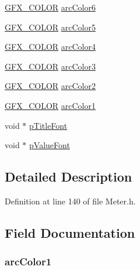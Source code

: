 \begin{DoxyCompactItemize}
\item 
\hyperlink{gfxcolors_8h_a0658edb6e7bd88d6e9a185711893441c}{G\+F\+X\+\_\+\+C\+O\+L\+O\+R} \hyperlink{struct_m_e_t_e_r_aaacd0d38be129470d8bf48715356357e}{arc\+Color6}
\item 
\hyperlink{gfxcolors_8h_a0658edb6e7bd88d6e9a185711893441c}{G\+F\+X\+\_\+\+C\+O\+L\+O\+R} \hyperlink{struct_m_e_t_e_r_adb53152dff0da9b12db82ddd2fc5a203}{arc\+Color5}
\item 
\hyperlink{gfxcolors_8h_a0658edb6e7bd88d6e9a185711893441c}{G\+F\+X\+\_\+\+C\+O\+L\+O\+R} \hyperlink{struct_m_e_t_e_r_afd5b6bda1761046f32fe723529d1d849}{arc\+Color4}
\item 
\hyperlink{gfxcolors_8h_a0658edb6e7bd88d6e9a185711893441c}{G\+F\+X\+\_\+\+C\+O\+L\+O\+R} \hyperlink{struct_m_e_t_e_r_a1824b0ec484eb62094feadd7e169f78d}{arc\+Color3}
\item 
\hyperlink{gfxcolors_8h_a0658edb6e7bd88d6e9a185711893441c}{G\+F\+X\+\_\+\+C\+O\+L\+O\+R} \hyperlink{struct_m_e_t_e_r_a8262f0e2fe448faf6944e5f8ccdba0ac}{arc\+Color2}
\item 
\hyperlink{gfxcolors_8h_a0658edb6e7bd88d6e9a185711893441c}{G\+F\+X\+\_\+\+C\+O\+L\+O\+R} \hyperlink{struct_m_e_t_e_r_a0dc39562c583abc3fa71fe4bb21611e6}{arc\+Color1}
\item 
void $\ast$ \hyperlink{struct_m_e_t_e_r_afd3139e482e6e0036da7aa3232ac977b}{p\+Title\+Font}
\item 
void $\ast$ \hyperlink{struct_m_e_t_e_r_a400aaf0eb1e89b664ad1fdc29654689a}{p\+Value\+Font}
\end{DoxyCompactItemize}


\subsection{Detailed Description}


Definition at line 140 of file Meter.\+h.



\subsection{Field Documentation}
\hypertarget{struct_m_e_t_e_r_a0dc39562c583abc3fa71fe4bb21611e6}{}
\subsubsection[{arc\+Color1}]{ arc\+Color1}\label{struct_m_e_t_e_r_a0dc39562c583abc3fa71fe4bb21611e6}


